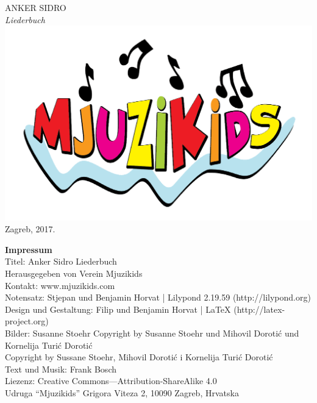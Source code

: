 \documentclass[a4paper,twoside, svgnames]{article}
\newcommand{\doccolor}{\color{sidro}}
\newcommand{\impresspac}{7pt}
\newcommand*{\titleTH}{\begingroup
\vspace*{5cm}
\begin{center}
{{\fontsize{50}{60}\selectfont
\textsf{\textcolor{anker}{ANKER} \textcolor{sidro}{SIDRO}}}}\\
\vspace*{0.3cm}
{\fontsize{70}{80}\selectfont
\itshape\textrm{Liederbuch}}
\vfill %
\includegraphics[width=0.2\linewidth]{images/mjuzikids_logo}\\
\vspace*{0.5cm}
{Zagreb, 2017.}\par %
\end{center}
\endgroup}
\begin{document}
\thispagestyle {empty}
\titleTH

\newpage
\thispagestyle {empty}
\begin{center}
\vspace*{\fill}
\begin{onehalfspacing}
\textbf{\textsf{Impressum}}\\
\vspace{10pt}
Titel: Anker Sidro Liederbuch\\
\vspace{\impresspac}
Herausgegeben von Verein Mjuzikids\\
\vspace{\impresspac}
Kontakt: www.mjuzikids.com\\
\vspace{\impresspac}
Notensatz: Stjepan und Benjamin Horvat | Lilypond 2.19.59 (http://lilypond.org)\\
\vspace{\impresspac}
Design und Gestaltung: Filip und Benjamin Horvat | LaTeX (http://latex-project.org) \\
\vspace{\impresspac}
Bilder: Susanne Stoehr Copyright by Susanne Stoehr und Mihovil Dorotić und  Kornelija Turić Dorotić\\
Copyright by Sussane Stoehr, Mihovil Dorotić i Kornelija Turić Dorotić\\
\vspace{\impresspac}
Text und Musik: Frank Bosch\\
\vspace{\impresspac}
Liezenz: Creative Commons—Attribution-ShareAlike 4.0\\
\vspace{\impresspac}
Udruga “Mjuzikids” Grigora Viteza 2, 10090 Zagreb, Hrvatska\\
\vspace{\impresspac}
\vspace{\impresspac}
\vspace{\impresspac}

\end{onehalfspacing}
\end{center}

\newpage
\begin{adjustwidth*}{2cm}{2cm}
\renewcommand{\cftsecfont}{\rmfamily}
\renewcommand{\cftsecpagefont}{\sffamily}
\renewcommand{\cfttoctitlefont}{\rmfamily\fontsize{50}{60}\selectfont}
\renewcommand{\contentsname}{
    {\rmfamily\hfill\doccolor Inhaltsverzeichnis \hfill}
    
    \vspace*{0.5cm}
    
    {\Huge\hfill Liederbuch \textit{Anker} -- CD2 \hfill}
}
\renewcommand{\cftaftertoctitle}{\vspace*{3cm}}
\vspace*{1cm}
{\large{\tableofcontents}}
\thispagestyle {empty}
\end{adjustwidth*}
\end{document}
